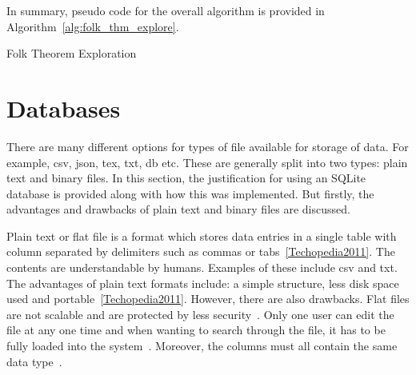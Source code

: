 In summary, pseudo code for the overall algorithm is provided
in Algorithm~\ref{alg:folk_thm_explore}.

\IncMargin{2em}
\begin{algorithm}[H]
    \DontPrintSemicolon

    \caption{Folk Theorem Exploration}\label{alg:folk_thm_explore}
\end{algorithm}
\DecMargin{2em}



\section{Databases}\label{sec:Databases}
There are many different options for types of file available for storage of
data. For example, csv, json, tex, txt, db etc. These are generally split into
two types: plain text and binary files. In this section, the justification for
using an SQLite database is provided along with how this was implemented.
But firstly, the advantages and drawbacks of plain text and binary files are
discussed.

Plain text or flat file is a format which stores data entries in a single table
with column separated by delimiters such as commas or tabs~\ref{Techopedia2011}.
The contents are understandable by humans. Examples of these
include csv and txt. The advantages of plain text formats include: a simple
structure, less disk space used and portable~\ref{Techopedia2011}. However, there
are also drawbacks. Flat files are not scalable and
are protected by less security~\cite{Thomas2018}. Only one user can edit the file at any one time
and when wanting to search through the file, it has to be fully loaded into the
system~\cite{Burke2017}. Moreover, the columns must all contain the same data type~\cite{Techopedia2011}.

